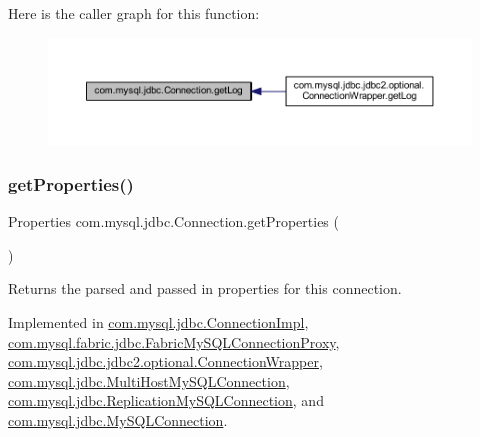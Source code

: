Here is the caller graph for this function\+:\nopagebreak
\begin{figure}[H]
\begin{center}
\leavevmode
\includegraphics[width=350pt]{interfacecom_1_1mysql_1_1jdbc_1_1_connection_a1cca3272f995742c608a1646e1433704_icgraph}
\end{center}
\end{figure}
\mbox{\label{interfacecom_1_1mysql_1_1jdbc_1_1_connection_ad594d416be84166aff54270aa66b3d71}} 
\subsubsection{\texorpdfstring{get\+Properties()}{getProperties()}}
{\footnotesize\ttfamily Properties com.\+mysql.\+jdbc.\+Connection.\+get\+Properties (\begin{DoxyParamCaption}{ }\end{DoxyParamCaption})}

Returns the parsed and passed in properties for this connection. 

Implemented in \mbox{\hyperlink{classcom_1_1mysql_1_1jdbc_1_1_connection_impl_a12d59167c09571dff544e96ff65b302b}{com.\+mysql.\+jdbc.\+Connection\+Impl}}, \mbox{\hyperlink{classcom_1_1mysql_1_1fabric_1_1jdbc_1_1_fabric_my_s_q_l_connection_proxy_aad58676ee781e3c04ec97545c95430cc}{com.\+mysql.\+fabric.\+jdbc.\+Fabric\+My\+S\+Q\+L\+Connection\+Proxy}}, \mbox{\hyperlink{classcom_1_1mysql_1_1jdbc_1_1jdbc2_1_1optional_1_1_connection_wrapper_a5f9c13aa2ff933d03836b6217c781fd7}{com.\+mysql.\+jdbc.\+jdbc2.\+optional.\+Connection\+Wrapper}}, \mbox{\hyperlink{classcom_1_1mysql_1_1jdbc_1_1_multi_host_my_s_q_l_connection_a06880fce49c4791eca1bf52761c51ab4}{com.\+mysql.\+jdbc.\+Multi\+Host\+My\+S\+Q\+L\+Connection}}, \mbox{\hyperlink{classcom_1_1mysql_1_1jdbc_1_1_replication_my_s_q_l_connection_a93f7c5bbec567b742e4f9f94b81f1493}{com.\+mysql.\+jdbc.\+Replication\+My\+S\+Q\+L\+Connection}}, and \mbox{\hyperlink{interfacecom_1_1mysql_1_1jdbc_1_1_my_s_q_l_connection_a494cb1c438fb5e65b5fb9916c8331191}{com.\+mysql.\+jdbc.\+My\+S\+Q\+L\+Connection}}.

